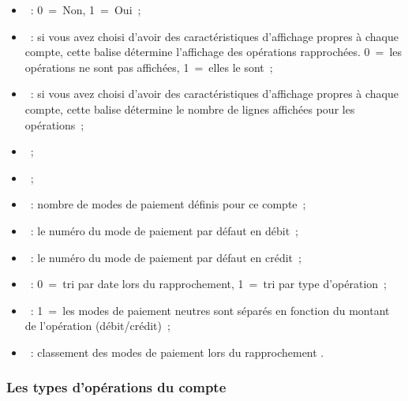 \begin{itemize}
\item {}~: 0~=~Non, 1~=~Oui~;

\item {}~: si vous avez choisi d'avoir des caractéristiques d'affichage propres à chaque compte, cette balise détermine l'affichage des opérations rapprochées. 0~=~les opérations ne sont pas affichées, 1~=~elles le sont~;

\item {}~: si vous avez choisi d'avoir des caractéristiques d'affichage propres à chaque compte, cette balise détermine le nombre de lignes affichées pour les opérations~;

\item {}~;

\item {}~;

\item {}~: nombre de modes de paiement définis pour ce compte~;

\item {}~: le numéro du 
mode de paiement par défaut en débit~;

\item {}~: le numéro du 
mode de paiement par défaut en crédit~;

\item {}~: 0~=~tri par date 
lors du rapprochement, 1~=~tri par type d'opération~;

\item {}~: 1~=~les modes de paiement
neutres sont séparés en fonction du montant de l'opération (débit/crédit)~;

\item {}~: classement des modes
de paiement lors du rapprochement .

\end{itemize}

\subsubsection{Les types d'opérations du compte}

